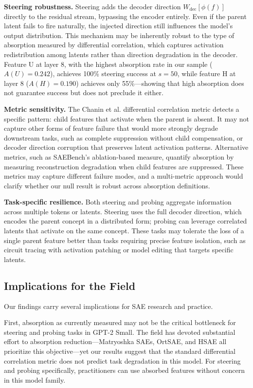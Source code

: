 \documentclass{article}
\begin{document}
\textbf{Steering robustness.} Steering adds the decoder direction $W_{\text{dec}}[\phi(f)]$ directly to the residual stream, bypassing the encoder entirely. Even if the parent latent fails to fire naturally, the injected direction still influences the model's output distribution. This mechanism may be inherently robust to the type of absorption measured by differential correlation, which captures activation redistribution among latents rather than direction degradation in the decoder. Feature U at layer 8, with the highest absorption rate in our sample ($A(U) = 0.242$), achieves 100\% steering success at $s = 50$, while feature H at layer 8 ($A(H) = 0.190$) achieves only 55\%---showing that high absorption does not guarantee success but does not preclude it either.

\textbf{Metric sensitivity.} The Chanin et al. differential correlation metric detects a specific pattern: child features that activate when the parent is absent. It may not capture other forms of feature failure that would more strongly degrade downstream tasks, such as complete suppression without child compensation, or decoder direction corruption that preserves latent activation patterns. Alternative metrics, such as SAEBench's ablation-based measure, quantify absorption by measuring reconstruction degradation when child features are suppressed. These metrics may capture different failure modes, and a multi-metric approach would clarify whether our null result is robust across absorption definitions.

\textbf{Task-specific resilience.} Both steering and probing aggregate information across multiple tokens or latents. Steering uses the full decoder direction, which encodes the parent concept in a distributed form; probing can leverage correlated latents that activate on the same concept. These tasks may tolerate the loss of a single parent feature better than tasks requiring precise feature isolation, such as circuit tracing with activation patching or model editing that targets specific latents.

\subsection{Implications for the Field}

Our findings carry several implications for SAE research and practice.

First, absorption as currently measured may not be the critical bottleneck for steering and probing tasks in GPT-2 Small. The field has devoted substantial effort to absorption reduction---Matryoshka SAEs, OrtSAE, and HSAE all prioritize this objective---yet our results suggest that the standard differential correlation metric does not predict task degradation in this model. For steering and probing specifically, practitioners can use absorbed features without concern in this model family.
\end{document}
